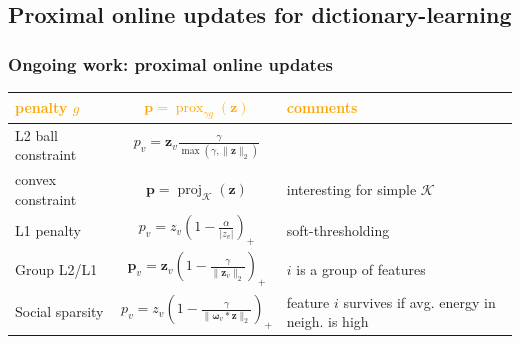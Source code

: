\documentclass{beamer}
\def\B#1{\mathbf{#1}}
\def\emph#1{\textbf{\textcolor{orange}{#1}}}
\DeclareMathOperator{\prox}{prox}
\DeclareMathOperator{\proj}{proj}
\newcommand{\mycite}[1]{\textcolor{myblue}{\text{ [#1]}}}
\begin{document}
\subsection{Proximal online updates for dictionary-learning}
\begin{frame}
  \frametitle{Ongoing work: proximal online updates }
  \vspace{-2em}
\begin{table}[H]
  \begin{tabular}{p{}|c|p{13cm}}\hline
    \emph{penalty $g$} & \emph{$\B{p} = \prox_{\gamma g}(\B{z})$} & \emph{comments}\\\hline
    L2 ball constraint & $p_v = \B{z}_v\frac{\gamma}{\max(\gamma,\|\B{z}\|_2)}$ & \mycite{Mairal 2010}\\ \hline
    convex constraint & $\B{p} = \proj_{\mathcal K}(\B{z})$ & interesting for simple $\mathcal K$\\ \hline
    L1 penalty & $p_v = z_v\left(1 - \frac{\alpha}{|z_v|}\right)_+$ & soft-thresholding \\\hline
    Group L2/L1 & $\B{p}_v = \B{z}_v\left(1 - \frac{\gamma}{\|\B{z}_v\|_2}\right)_+$ & $i$ is a group of features\\\hline
    Social sparsity \newline \mycite{Kowalski '09} & $p_v = z_v\left(1 - \frac{\gamma}{\|\boldsymbol{\omega}_v * \B{z}\|_2}\right)_+$
                                                    & feature $i$ survives if avg. \newline energy in neigh. is high\\\hline
  \end{tabular}
\end{table}


\end{frame}
\end{document}
